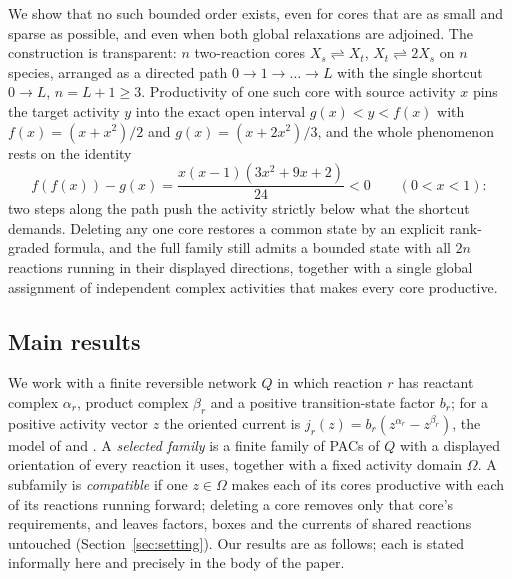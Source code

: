 \documentclass[11pt,a4paper]{article}
\theoremstyle{plain}
\theoremstyle{definition}
\theoremstyle{remark}
\newcommand{\rev}{\rightleftharpoons}
\begin{document}
We show that no such bounded order exists, even for cores that are as small and sparse as possible, and even when both global relaxations are adjoined. The construction is transparent: $n$ two-reaction cores $X_s\rev X_t$, $X_t\rev 2X_s$ on $n$ species, arranged as a directed path $0\to1\to\dots\to L$ with the single shortcut $0\to L$, $n=L+1\ge3$. Productivity of one such core with source activity $x$ pins the target activity $y$ into the exact open interval $g(x)<y<f(x)$ with $f(x)=(x+x^2)/2$ and $g(x)=(x+2x^2)/3$, and the whole phenomenon rests on the identity
\[
f(f(x))-g(x)=\frac{x(x-1)(3x^2+9x+2)}{24}<0\qquad(0<x<1):
\]
two steps along the path push the activity strictly below what the shortcut demands. Deleting any one core restores a common state by an explicit rank-graded formula, and the full family still admits a bounded state with all $2n$ reactions running in their displayed directions, together with a single global assignment of independent complex activities that makes every core productive.

\subsection{Main results}\label{sec:mainresults}

We work with a finite reversible network $Q$ in which reaction $r$ has reactant complex $\alpha_r$, product complex $\beta_r$ and a positive transition-state factor $b_r$; for a positive activity vector $z$ the oriented current is $j_r(z)=b_r(z^{\alpha_r}-z^{\beta_r})$, the model of \citep{kosc2025} and \citep{tcic2026}. A \emph{selected family} is a finite family of PACs of $Q$ with a displayed orientation of every reaction it uses, together with a fixed activity domain $\Omega$. A subfamily is \emph{compatible} if one $z\in\Omega$ makes each of its cores productive with each of its reactions running forward; deleting a core removes only that core's requirements, and leaves factors, boxes and the currents of shared reactions untouched (Section~\ref{sec:setting}). Our results are as follows; each is stated informally here and precisely in the body of the paper.
\end{document}
